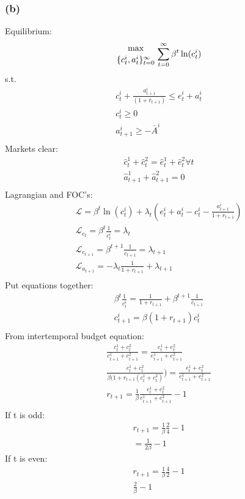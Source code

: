 \documentclass[10pt, a4paper]{article}
\begin{document}
    \subsubsection*{(b)}
      Equilibrium:
      \begin{gather*}
        {\max\atop{\{c_t^i, a_t^i\}^{\infty}_{t=0}}} \sum\limits_{t=0}^{\infty} \beta^t\ln(c_t^i) \\
      \end{gather*}
      s.t.
      \begin{gather*}
        c_t^i  +\frac{a_{t+1}^i}{(1+\hat{r}_{t+1})} \leq e_t^i+a_t^i \\
        c_t^i \geq 0 \\
        a_{t+1}^i \geq -\bar{A}^i \\
      \end{gather*}
      Markets clear:
      \begin{gather*}
        \hat{c}_t^1 + \hat{c}_t^2 = \hat{e}_t^1 + \hat{e}_t^2 \forall t \\
        \hat{a}_{t+1}^1 + \hat{a}_{t+1}^2 = 0 \\
      \end{gather*}
      Lagrangian and FOC's: 
      \begin{gather*}
        \mathcal{L} = \beta^t\ln(c_t^i) + \lambda_t(e_t^i+a_t^i-c_t^i-\frac{a_{t+1}^i}{1+r_{t+1}}) \\
        \mathcal{L}_{c_t} = \beta^t\frac{1}{c_t^i} = \lambda_t \\
        \mathcal{L}_{c_{t+1}} = \beta^{t+1}\frac{1}{c_{t+1}} = \lambda_{t+1} \\
        \mathcal{L}_{a_{t+1}} = -\lambda_t\frac{1}{1+r_{t+1}} + \lambda_{t+1} \\
      \end{gather*}
      Put equations together:
      \begin{gather*}
        \beta^t\frac{1}{c_t^i} = \frac{1}{1+r_{t+1}}+\beta^{t+1}\frac{1}{c_{t+1}} \\
        \boxed{c_{t+1}^i = \beta(1+r_{t+1})c_t^i} \\
      \end{gather*}
      From intertemporal budget equation:
      \begin{gather*}
        \frac{c_t^1+c_t^2}{c_{t+1}^1+c_{t+1}^2} = \frac{e_t^1+e_t^2}{e_{t+1}^1+e_{t+1}^2} \\
        \frac{c_t^1+c_t^2}{\beta(1+r_{t+1}(c_t^1+c_t^2)}) = \frac{e_t^1+e_t^2}{e_{t+1}^1+e_{t+1}^2} \\
        \boxed{r_{t+1} = \frac{1}{\beta}\frac{e_t^1+e_t^2}{e_{t+1}^1+e_{t+1}^2}-1} \\
      \end{gather*}
      If t is odd:
      \begin{gather*}
        r_{t+1} = \frac{1}{\beta}\frac{2}{4} - 1 \\ 
        \boxed{= \frac{1}{2\beta}-1}
      \end{gather*}
      If t is even:
      \begin{gather*}
        r_{t+1} = \frac{1}{\beta}\frac{4}{2} - 1 \\
        \boxed{\frac{2}{\beta}-1}
      \end{gather*}
\end{document}
